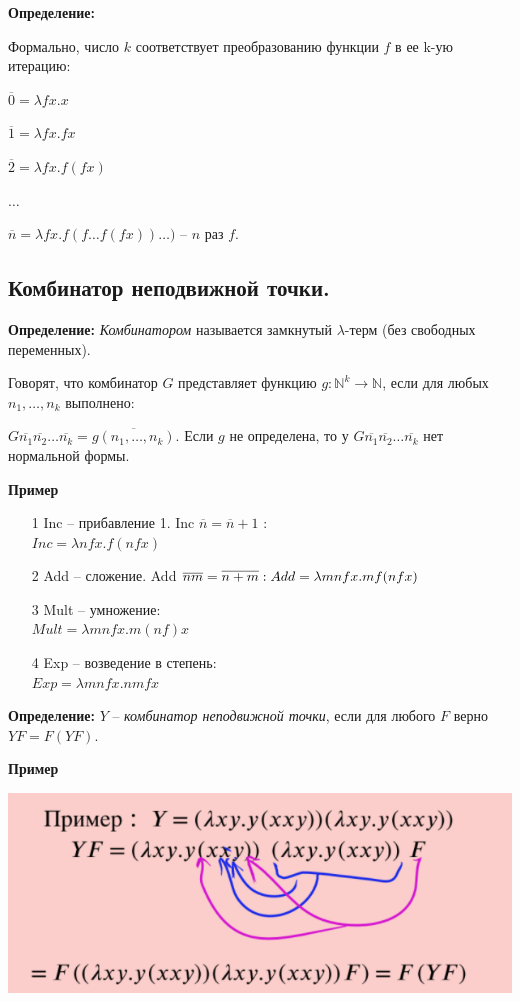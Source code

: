 \textbf{Определение: } 

Формально, число $k$ соответствует преобразованию функции $f$ в ее k-ую итерацию:

\begin{center}
    $\overline{0} = \lambda fx.x$
    
    $\overline{1} = \lambda fx.fx$
    
    $\overline{2} = \lambda fx.f(fx)$
    
    $\dots$
    
    $\overline{n} = \lambda fx. f(f\ldots f(fx))\ldots)$ -- $n$ раз $f$.
\end{center}

\subsection{Комбинатор неподвижной точки.}

\textbf{Определение: } \textit{Комбинатором} называется замкнутый $\lambda$-терм (без свободных переменных).

Говорят, что комбинатор $G$ представляет функцию $g: \mathbb{N}^k \rightarrow \mathbb{N}$, если для любых $n_1, \ldots, n_k$ выполнено:
\begin{center}
    $G\overline{n_1}\overline{n_2}\ldots\overline{n_k} = \overline{g(n_1,\ldots,n_k)}$. Если $g$ не определена, то у $G\overline{n_1}\overline{n_2}\ldots\overline{n_k}$ нет нормальной формы.
\end{center}
\textbf{Пример}
\begin{itemize}
    \item [1] Inc -- прибавление 1. Inc $\overline{n} = \overline{n} + 1$ : \\
    $Inc = \lambda nfx.f(nfx)$
    \item [2] Add -- сложение.  Add $\overline{n} \overline{m} = \overline{n + m}: \\
    Add = \lambda mn fx.mf(nfx)$
    \item[3] Mult -- умножение:\\
    $Mult = \lambda mn fx. m(nf)x$
     \item[4] Exp -- возведение в степень:\\
    $Exp = \lambda mn fx. nmfx$
\end{itemize}

\textbf{Определение: } $Y$ -- \textit{комбинатор неподвижной точки}, если для любого $F$ верно $YF = F(YF)$.

\textbf{Пример}
\begin{center}
    \includegraphics{images/3 (определения)_m32.PNG}
\end{center}
